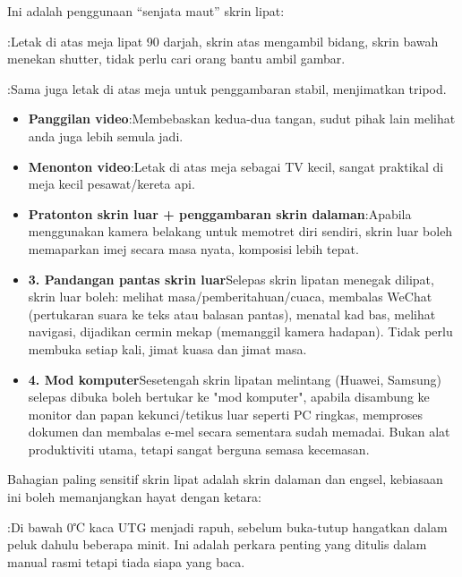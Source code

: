 
Ini adalah penggunaan “senjata maut” skrin lipat:


:Letak di atas meja lipat 90 darjah, skrin atas mengambil bidang, skrin bawah menekan shutter, tidak perlu cari orang bantu ambil gambar.


:Sama juga letak di atas meja untuk penggambaran stabil, menjimatkan tripod.

\begin{itemize}
  \item \textbf{Panggilan video}:Membebaskan kedua-dua tangan, sudut pihak lain melihat anda juga lebih semula jadi.
  \item \textbf{Menonton video}:Letak di atas meja sebagai TV kecil, sangat praktikal di meja kecil pesawat/kereta api.
  \item \textbf{Pratonton skrin luar + penggambaran skrin dalaman}:Apabila menggunakan kamera belakang untuk memotret diri sendiri, skrin luar boleh memaparkan imej secara masa nyata, komposisi lebih tepat.
  \item \textbf{3. Pandangan pantas skrin luar}Selepas skrin lipatan menegak dilipat, skrin luar boleh: melihat masa/pemberitahuan/cuaca, membalas WeChat (pertukaran suara ke teks atau balasan pantas), menatal kad bas, melihat navigasi, dijadikan cermin mekap (memanggil kamera hadapan). Tidak perlu membuka setiap kali, jimat kuasa dan jimat masa.
  \item \textbf{4. Mod komputer}Sesetengah skrin lipatan melintang (Huawei, Samsung) selepas dibuka boleh bertukar ke "mod komputer", apabila disambung ke monitor dan papan kekunci/tetikus luar seperti PC ringkas, memproses dokumen dan membalas e-mel secara sementara sudah memadai. Bukan alat produktiviti utama, tetapi sangat berguna semasa kecemasan.
\end{itemize}


Bahagian paling sensitif skrin lipat adalah skrin dalaman dan engsel, kebiasaan ini boleh memanjangkan hayat dengan ketara:


:Di bawah 0℃ kaca UTG menjadi rapuh, sebelum buka-tutup hangatkan dalam peluk dahulu beberapa minit. Ini adalah perkara penting yang ditulis dalam manual rasmi tetapi tiada siapa yang baca.

